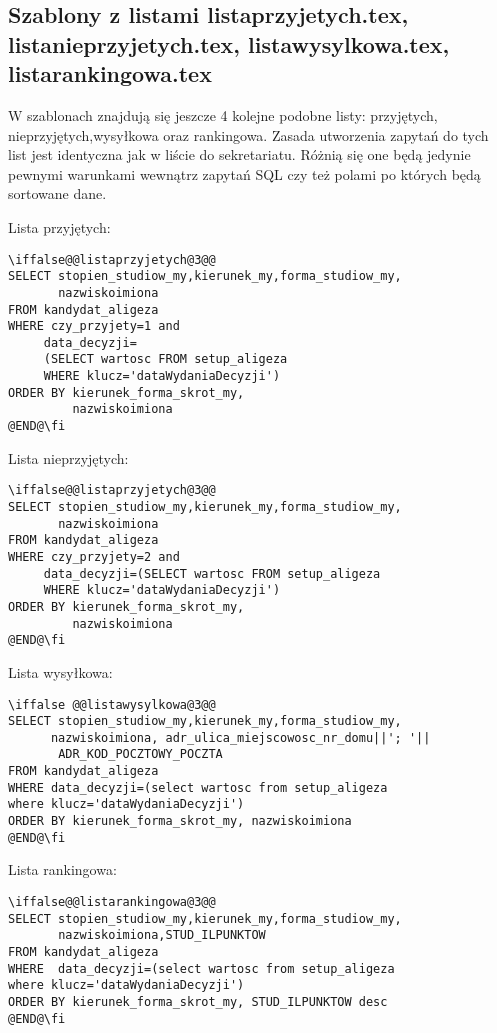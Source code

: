 \subsection*{Szablony z listami listaprzyjetych.tex, listanieprzyjetych.tex, listawysylkowa.tex, listarankingowa.tex}
W szablonach znajdują się jeszcze 4 kolejne podobne listy: przyjętych, nieprzyjętych,wysyłkowa oraz rankingowa. Zasada utworzenia zapytań do tych list jest identyczna jak w liście do sekretariatu. Różnią się one będą jedynie pewnymi warunkami wewnątrz zapytań SQL czy też polami po których będą sortowane dane.

\par Lista przyjętych:
 \begin{lstlisting}
\iffalse@@listaprzyjetych@3@@
SELECT stopien_studiow_my,kierunek_my,forma_studiow_my,
       nazwiskoimiona 
FROM kandydat_aligeza 
WHERE czy_przyjety=1 and
     data_decyzji=
     (SELECT wartosc FROM setup_aligeza 
     WHERE klucz='dataWydaniaDecyzji')
ORDER BY kierunek_forma_skrot_my,
         nazwiskoimiona
@END@\fi
\end{lstlisting}
\par Lista nieprzyjętych:
 \begin{lstlisting}
\iffalse@@listaprzyjetych@3@@
SELECT stopien_studiow_my,kierunek_my,forma_studiow_my,
       nazwiskoimiona 
FROM kandydat_aligeza 
WHERE czy_przyjety=2 and
     data_decyzji=(SELECT wartosc FROM setup_aligeza 
     WHERE klucz='dataWydaniaDecyzji')
ORDER BY kierunek_forma_skrot_my,
         nazwiskoimiona
@END@\fi
\end{lstlisting}
\par Lista wysyłkowa:
 \begin{lstlisting}
\iffalse @@listawysylkowa@3@@
SELECT stopien_studiow_my,kierunek_my,forma_studiow_my,
      nazwiskoimiona, adr_ulica_miejscowosc_nr_domu||'; '||
       ADR_KOD_POCZTOWY_POCZTA
FROM kandydat_aligeza 
WHERE data_decyzji=(select wartosc from setup_aligeza 
where klucz='dataWydaniaDecyzji')
ORDER BY kierunek_forma_skrot_my, nazwiskoimiona
@END@\fi
\end{lstlisting}
\par Lista rankingowa:
 \begin{lstlisting}
\iffalse@@listarankingowa@3@@
SELECT stopien_studiow_my,kierunek_my,forma_studiow_my,
       nazwiskoimiona,STUD_ILPUNKTOW
FROM kandydat_aligeza
WHERE  data_decyzji=(select wartosc from setup_aligeza 
where klucz='dataWydaniaDecyzji')
ORDER BY kierunek_forma_skrot_my, STUD_ILPUNKTOW desc
@END@\fi
\end{lstlisting}
\par 
